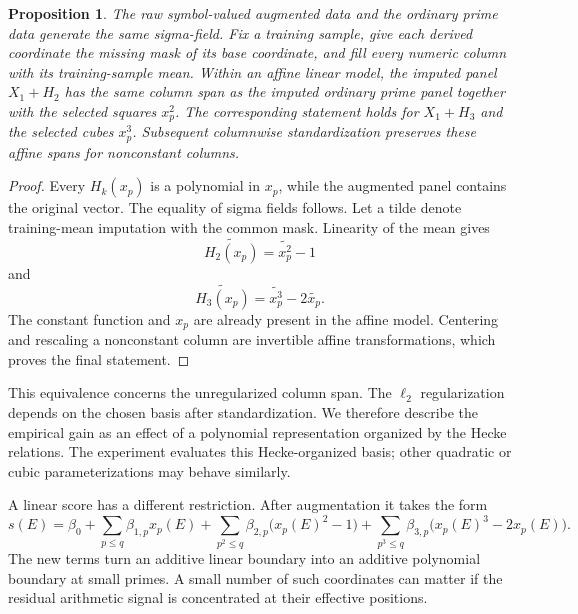 \documentclass[12pt,reqno]{amsart}
\numberwithin{equation}{section}
\theoremstyle{plain}
\newtheorem{proposition}[theorem]{Proposition}
\theoremstyle{definition}
\theoremstyle{remark}
\begin{document}
\begin{proposition}
\label{propRepresentation}
The raw symbol-valued augmented data and the ordinary prime data generate the same sigma-field.
Fix a training sample, give each derived coordinate the missing mask of its base coordinate, and fill every numeric column with its training-sample mean.
Within an affine linear model, the imputed panel $X_1+H_2$ has the same column span as the imputed ordinary prime panel together with the selected squares $x_p^2$.
The corresponding statement holds for $X_1+H_3$ and the selected cubes $x_p^3$.
Subsequent columnwise standardization preserves these affine spans for nonconstant columns.
\end{proposition}

\begin{proof}
Every $H_k(x_p)$ is a polynomial in $x_p$, while the augmented panel contains the original vector.
The equality of sigma fields follows.
Let a tilde denote training-mean imputation with the common mask.
Linearity of the mean gives
\begin{equation*}
\widetilde{H_2(x_p)}=\widetilde{x_p^2}-1
\end{equation*}
and
\begin{equation*}
\widetilde{H_3(x_p)}=\widetilde{x_p^3}-2\widetilde{x_p}.
\end{equation*}
The constant function and $x_p$ are already present in the affine model.
Centering and rescaling a nonconstant column are invertible affine transformations, which proves the final statement.
\end{proof}

This equivalence concerns the unregularized column span. The $\ell_2$ regularization depends on the chosen basis after standardization.
We therefore describe the empirical gain as an effect of a polynomial representation organized by the Hecke relations.
The experiment evaluates this Hecke-organized basis; other quadratic or cubic parameterizations may behave similarly.

A linear score has a different restriction.
After augmentation it takes the form
\begin{equation}
\label{eqScore}
s(E)=\beta_0+
\sum_{p\leq q}\beta_{1,p}x_p(E)+
\sum_{p^2\leq q}\beta_{2,p}\bigl(x_p(E)^2-1\bigr)+
\sum_{p^3\leq q}\beta_{3,p}\bigl(x_p(E)^3-2x_p(E)\bigr).
\end{equation}
The new terms turn an additive linear boundary into an additive polynomial boundary at small primes.
A small number of such coordinates can matter if the residual arithmetic signal is concentrated at their effective positions.
\end{document}
